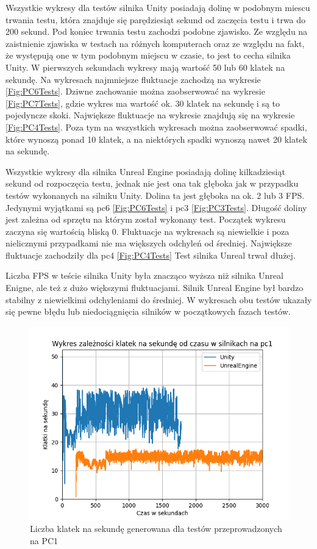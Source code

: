 \documentclass[12pt,twoside]{article}
\begin{document}
Wszystkie wykresy dla testów silnika Unity posiadają dolinę w podobnym miescu
trwania testu, która znajduje się parędziesiąt sekund od zaczęcia testu i trwa
do 200 sekund. Pod koniec trwania testu zachodzi podobne zjawisko. Ze względu na
zaistnienie zjawiska w testach na różnych komputerach oraz ze względu na fakt,
że występują one w tym podobnym miejscu w czasie, to jest to cecha silnika
Unity. W pierwszych sekundach wykresy mają wartość 50 lub 60 klatek na sekundę.
Na wykresach najmniejsze fluktuacje zachodzą na wykresie \ref{Fig:PC6Tests}.
Dziwne zachowanie można zaobserwować na wykresie \ref{Fig:PC7Tests}, gdzie
wykres ma wartość ok. 30 klatek na sekundę i są to pojedyncze skoki. Największe
fluktuacje na wykresie znajdują się na wykresie \ref{Fig:PC4Tests}. Poza tym na
wszystkich wykresach można zaobserwować spadki, które wynoszą ponad 10 klatek, a
na niektórych spadki wynoszą nawet 20 klatek na sekundę. 

Wszystkie wykresy dla silnika Unreal Engine posiadają dolinę kilkadziesiąt
sekund od rozpoczęcia testu, jednak nie jest ona tak głęboka jak w przypadku
testów wykonanych na silniku Unity. Dolina ta jest głęboka na ok. 2 lub 3 FPS.
Jedynymi wyjątkami są pc6 \ref{Fig:PC6Tests} i pc3 \ref{Fig:PC3Tests}. Długość
doliny jest zależna od sprzętu na którym został wykonany test. Początek wykresu
zaczyna się wartością bliską 0. Fluktuacje na wykresach są niewielkie i poza
nielicznymi przypadkami nie ma większych odchyleń od średniej. Największe
fluktuacje zachodziły dla pc4 \ref{Fig:PC4Tests} Test silnika Unreal trwał
dłużej.

Liczba FPS w teście silnika Unity była znacząco wyższa niż silnika Unreal
Enigne, ale też z dużo większymi fluktuacjami. Silnik Unreal Engine był bardzo
stabilny z niewielkimi odchyleniami do średniej. W wykresach obu testów ukazały
się pewne błędu lub niedociągnięcia silników w początkowych fazach testów.  

\begin{figure}[ht]
    \centering
    \includegraphics[width=16cm]{figures/FPSPlots/pc1searchedDataName.png}
    \caption{Liczba klatek na sekundę generowana dla testów przeprowadzonych na PC1}
    \label{Fig:PC1Tests}
\end{figure}        
\end{document}
